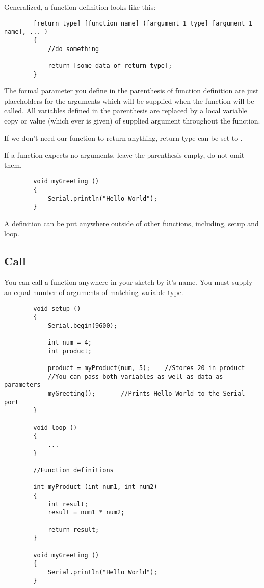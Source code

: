 \documentclass{article}
\begin{document}
		Generalized, a function definition looks like this:

		\begin{lstlisting}
		[return type] [function name] ([argument 1 type] [argument 1 name], ... )
		{
			//do something
			
			return [some data of return type];
		}
		\end{lstlisting}

		The formal parameter you define in the parenthesis of function definition are just placeholders for the arguments which will be supplied when the function will be called. All variables defined in the parenthesis are replaced by a local variable copy or value (which ever is given) of supplied argument throughout the function.

		If we don't need our function to return anything, return type can be set to .

		If a function expects no arguments, leave the parenthesis empty, do not omit them.
		
		\begin{lstlisting}
		void myGreeting ()
		{
			Serial.println("Hello World");
		}
		\end{lstlisting}

		A definition can be put anywhere outside of other functions, including, setup and loop.

	\subsection{Call}

		You can call a function anywhere in your sketch by it's name. You must supply an equal number of arguments of matching variable type.

		\begin{lstlisting}
		void setup ()
		{
			Serial.begin(9600);

			int num = 4;
			int product;

			product = myProduct(num, 5);	//Stores 20 in product
			//You can pass both variables as well as data as parameters
			myGreeting();		//Prints Hello World to the Serial port
		}

		void loop ()
		{
			...
		}

		//Function definitions

		int myProduct (int num1, int num2)
		{
			int result;
			result = num1 * num2;

			return result;
		}

		void myGreeting ()
		{
			Serial.println("Hello World");
		}
		
		\end{lstlisting}
\end{document}
